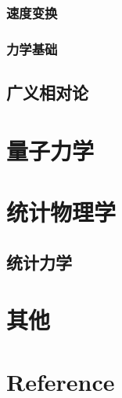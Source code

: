 \documentclass[UTF8]{../06-Physics}
\begin{document}
\subsection{速度变换}
\subsection{力学基础}



\section{广义相对论}



\chapter{量子力学} %




\chapter{统计物理学} %
\section{统计力学}

\chapter{其他}



\chapter{Reference}
\end{document}
